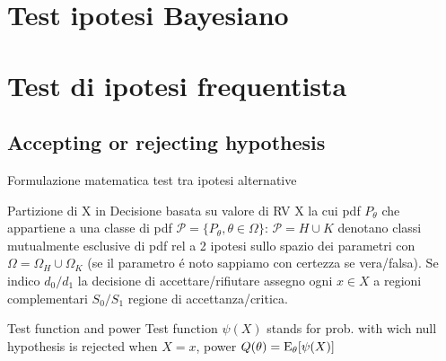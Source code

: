 \section{Test ipotesi Bayesiano}

\section{Test di ipotesi frequentista}


\subsection{Accepting or rejecting hypothesis}
	
\begin{frame}{Formulazione matematica test tra ipotesi alternative}\frameintoc
\begin{block}{Partizione di X in }
Decisione basata su valore di RV X la cui pdf $P_{\theta}$ che appartiene a una classe di pdf $\mathcal{P}=\{P_{\theta}, \theta\in\Omega\}$:  $\mathcal{P}=H\cup K$ denotano classi mutualmente esclusive di pdf rel a 2 ipotesi sullo spazio dei parametri con $\Omega=\Omega_H\cup\Omega_K$ (se il parametro \'e noto sappiamo con certezza se vera/falsa). Se indico $d_0/d_1$ la decisione di accettare/rifiutare assegno ogni $x\in X$ a regioni complementari $S_0/S_1$ regione di accettanza/critica.
\end{block}
\begin{block}{Test function and power}
Test function $\psi(X)$ stands for prob. with wich null hypothesis is rejected when $X=x$, power $Q(\theta)=\operatorname{E}_{\theta}[\psi(X)]$
\end{block}
\end{frame}

